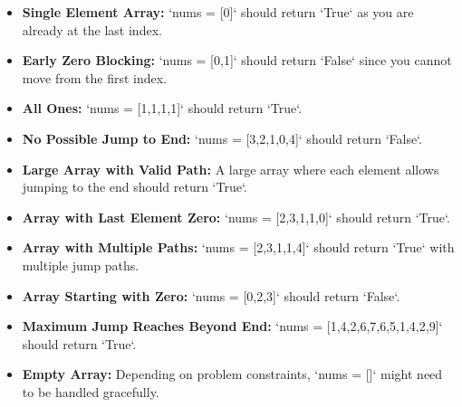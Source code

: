 \begin{itemize}
    \item \textbf{Single Element Array:} `nums = [0]` should return `True` as you are already at the last index.
    
    \item \textbf{Early Zero Blocking:} `nums = [0,1]` should return `False` since you cannot move from the first index.
    
    \item \textbf{All Ones:} `nums = [1,1,1,1]` should return `True`.
    
    \item \textbf{No Possible Jump to End:} `nums = [3,2,1,0,4]` should return `False`.
    
    \item \textbf{Large Array with Valid Path:} A large array where each element allows jumping to the end should return `True`.
    
    \item \textbf{Array with Last Element Zero:} `nums = [2,3,1,1,0]` should return `True`.
    
    \item \textbf{Array with Multiple Paths:} `nums = [2,3,1,1,4]` should return `True` with multiple jump paths.
    
    \item \textbf{Array Starting with Zero:} `nums = [0,2,3]` should return `False`.
    
    \item \textbf{Maximum Jump Reaches Beyond End:} `nums = [1,4,2,6,7,6,5,1,4,2,9]` should return `True`.
    
    \item \textbf{Empty Array:} Depending on problem constraints, `nums = []` might need to be handled gracefully.
\end{itemize}

\printindex